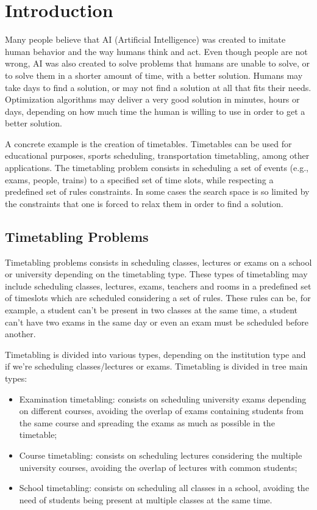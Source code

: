 \setcounter{secnumdepth}{2}
\chapter{Introduction}
\label{introduction}
\thispagestyle{plain}

Many people believe that AI (Artificial Intelligence) was created to imitate human behavior and the way humans think and act. Even though people are not wrong, AI was also created to solve problems that humans are unable to solve, or to solve them in a shorter amount of time, with a better solution. Humans may take days to find a solution, or may not find a solution at all that fits their needs. Optimization algorithms may deliver a very good solution in minutes, hours or days, depending on how much time the human is willing to use in order to get a better solution.

A concrete example is the creation of timetables. Timetables can be used for educational purposes, sports scheduling, transportation timetabling, among other applications. The timetabling problem consists in scheduling a set of events (e.g., exams, people, trains) to a specified set of time slots, while respecting a predefined set of rules constraints. In some cases the search space is so limited by the constraints that one is forced to relax them in order to find a solution. 


\section{Timetabling Problems}

Timetabling problems consists in scheduling classes, lectures or exams on a school or university depending on the timetabling type. These types of timetabling may include scheduling classes, lectures, exams, teachers and rooms in a predefined set of timeslots which are scheduled considering a set of rules. These rules can be, for example, a student can't be present in two classes at the same time, a student can't have two exams in the same day or even an exam must be scheduled before another.

Timetabling is divided into various types, depending on the institution type and if we're scheduling classes/lectures or exams. Timetabling is divided in tree main types:

\begin{itemize}
	\item Examination timetabling: consists on scheduling university exams depending on different courses, avoiding the overlap of exams containing students from the same course and spreading the exams as much as possible in the timetable;
	\item Course timetabling: consists on scheduling lectures considering the multiple university courses, avoiding the overlap of lectures with common students;
	\item School timetabling: consists on scheduling all classes in a school, avoiding the need of students being present at multiple classes at the same time.
\end{itemize}

